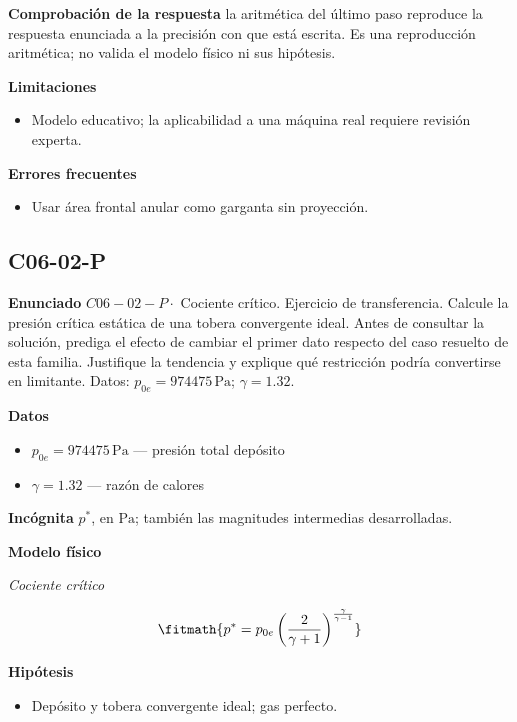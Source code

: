 \documentclass[10pt,openany]{book}
\begin{document}
\noindent\textbf{Comprobación de la respuesta} la aritmética del último paso reproduce la respuesta enunciada a la precisión con que está escrita. Es una reproducción aritmética; no valida el modelo físico ni sus hipótesis.

\noindent\textbf{Limitaciones}
\begin{itemize}
\item Modelo educativo; la aplicabilidad a una máquina real requiere revisión experta.
\end{itemize}

\noindent\textbf{Errores frecuentes}
\begin{itemize}
\item Usar área frontal anular como garganta sin proyección.
\end{itemize}
\subsection*{C06-02-P}

\noindent\textbf{Enunciado}
\(C06-02-P \cdot\) Cociente crítico. Ejercicio de transferencia. Calcule la presión crítica estática de una tobera convergente ideal. Antes de consultar la solución, prediga el efecto de cambiar el primer dato respecto del caso resuelto de esta familia. Justifique la tendencia y explique qué restricción podría convertirse en limitante. Datos: \(p_{0e}=974475\, \mathrm{Pa}\); \(\gamma=1.32\).

\noindent\textbf{Datos}
\begin{itemize}
\item $p_{0e} = 974475\,\mathrm{Pa}$ — presión total depósito
\item $\gamma = 1.32$ — razón de calores
\end{itemize}

\noindent\textbf{Incógnita}
$p^{*}$, en $\mathrm{Pa}$; también las magnitudes intermedias desarrolladas.

\noindent\textbf{Modelo físico}

\noindent\textit{Cociente crítico}

\[
\fitmath{p^{*}=p_{0e} \left(\frac{2}{\gamma + 1}\right)^{\frac{\gamma}{\gamma - 1}}}
\]

\noindent\textbf{Hipótesis}
\begin{itemize}
\item Depósito y tobera convergente ideal; gas perfecto.
\end{itemize}
\end{document}
